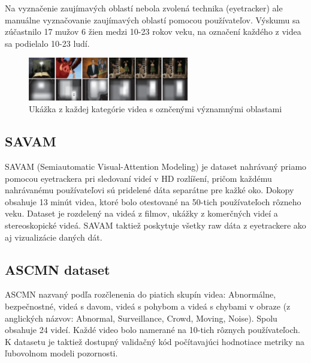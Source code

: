 Na vyznačenie zaujímavých oblastí nebola zvolená technika (eyetracker) ale manuálne vyznačovanie zaujímavých oblastí pomocou používateľov.
Výskumu sa zúčastnilo 17 mužov 6 žien medzi 10-23 rokov veku, na označení každého z videa sa podielalo 10-23 ludí.

\begin{figure}[H]
 \centering
 \includegraphics[width=7cm]{pics/rsd.png}
 \caption{Ukážka z každej kategórie videa s oznčenými významnými oblastami}
\end{figure}
\vspace{10mm}

\subsection{SAVAM}
SAVAM (Semiautomatic Visual-Attention Modeling) je dataset nahrávaný priamo pomocou eyetrackera pri sledovaní videí v HD rozlíšení, pričom každému nahrávanému používateľovi sú pridelené dáta separátne pre kažké oko.
Dokopy obsahuje 13 minút videa, ktoré bolo otestované na 50-tich používateľoch rôzneho veku.
Dataset je rozdelený na videá z filmov, ukážky z komerčných videí a stereoskopické videá.
SAVAM taktiež poskytuje všetky raw dáta z eyetrackere ako aj vizualizácie daných dát\cite{savam}.

\subsection{ASCMN dataset}
ASCMN nazvaný podľa rozčlenenia do piatich skupín videa: Abnormálne, bezpečnostné, videá s davom, videá s pohybom a videá s chybami v obraze (z anglických názvov: Abnormal, Surveillance, Crowd, Moving, Noise).
Spolu obsahuje 24 videí.
Každé video bolo namerané na 10-tich rôznych používateľoch.
K datasetu je taktiež dostupný validačný kód\cite{accv} počítavajúci hodnotiace metriky na ľubovolnom modeli pozornosti.


